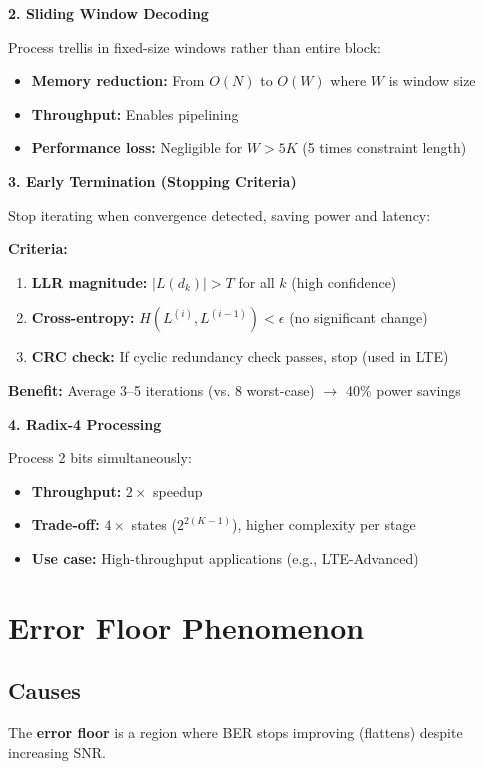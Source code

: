 \textbf{2. Sliding Window Decoding}

Process trellis in fixed-size windows rather than entire block:
\begin{itemize}
\item \textbf{Memory reduction:} From $O(N)$ to $O(W)$ where $W$ is window size
\item \textbf{Throughput:} Enables pipelining
\item \textbf{Performance loss:} Negligible for $W > 5K$ (5 times constraint length)
\end{itemize}

\textbf{3. Early Termination (Stopping Criteria)}

Stop iterating when convergence detected, saving power and latency:

\textbf{Criteria:}
\begin{enumerate}
\item \textbf{LLR magnitude:} $|L(d_k)| > T$ for all $k$ (high confidence)
\item \textbf{Cross-entropy:} $H(L^{(i)}, L^{(i-1)}) < \epsilon$ (no significant change)
\item \textbf{CRC check:} If cyclic redundancy check passes, stop (used in LTE)
\end{enumerate}

\textbf{Benefit:} Average 3--5 iterations (vs. 8 worst-case) $\rightarrow$ 40\% power savings

\textbf{4. Radix-4 Processing}

Process 2 bits simultaneously:
\begin{itemize}
\item \textbf{Throughput:} $2\times$ speedup
\item \textbf{Trade-off:} $4\times$ states ($2^{2(K-1)}$), higher complexity per stage
\item \textbf{Use case:} High-throughput applications (e.g., LTE-Advanced)
\end{itemize}

\section{Error Floor Phenomenon}

\subsection{Causes}

The \textbf{error floor} is a region where BER stops improving (flattens) despite increasing SNR.

